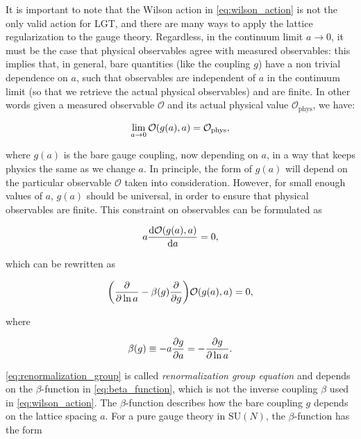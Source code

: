 \documentclass[reqno,12pt]{article}
\numberwithin{equation}{section}
\newcommand{\SU}{\mathrm{SU}}
\begin{document}
It is important to note that the Wilson action in \eqref{eq:wilson_action} is not the only valid action for LGT, and
there are many ways to apply the lattice regularization to the gauge theory. Regardless, in the continuum limit
$a \rightarrow 0$, it must be the case that physical observables agree with measured observables: this implies that,
in general, bare quantities (like the coupling $g$) have a non trivial dependence on $a$, such that observables are 
independent of $a$ in the continuum limit (so that we retrieve the actual physical observables) and are finite. In other words
given a measured observable $\mathcal{O}$ and its actual physical value $\mathcal{O}_\text{phys}$, we have:

\begin{equation}
	\lim_{a \rightarrow 0} \mathcal{O}\qty(g(a), a) = \mathcal{O}_\text{phys},
\end{equation}

where $g(a)$ is the bare gauge coupling, now depending on $a$, in a way that keeps physics the same as we change $a$. In principle,
the form of $g(a)$ will depend on the particular observable $\mathcal{O}$ taken into consideration. However, for small enough values
of $a$, $g(a)$ should be universal, in order to ensure that physical observables are finite. This constraint on observables
can be formulated as

\begin{equation}
	a \dv{\mathcal{O}\qty(g(a), a)}{a} = 0,
\end{equation}

which can be rewritten as

\begin{equation} \label{eq:renormalization_group}
	\qty(\pdv{\ln a} - \beta(g)\pdv{g}) \mathcal{O}\qty(g(a), a) = 0,
\end{equation}

where 

\begin{equation} \label{eq:beta_function}
	\beta(g) \equiv -a \pdv{g}{a} = -\pdv{g}{\ln a}.
\end{equation}

\eqref{eq:renormalization_group} is called \textit{renormalization group equation} and depends on the $\beta$-function in
\eqref{eq:beta_function}, which is not the inverse coupling $\beta$ used in \eqref{eq:wilson_action}. The $\beta$-function
describes how the bare coupling $g$ depends on the lattice spacing $a$. For a pure gauge theory in $\SU(N)$, the $\beta$-function has
the form
\end{document}
